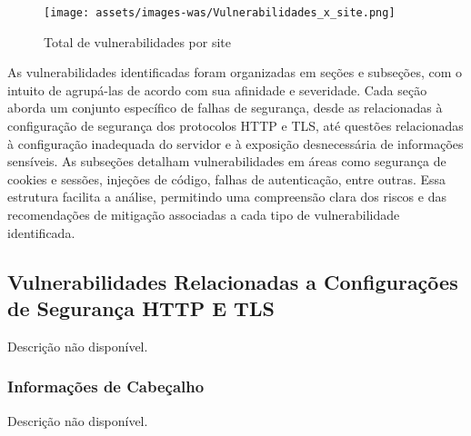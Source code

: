 \documentclass[a4paper,12pt]{article}
\begin{document}
\begin{figure}[h!]
    \centering
    \texttt{[image: assets/images-was/Vulnerabilidades\_x\_site.png]}
    \caption{Total de vulnerabilidades por site}
\end{figure}
\FloatBarrier
As vulnerabilidades identificadas foram organizadas em seções e subseções, com o intuito de agrupá-las de acordo com sua afinidade e severidade. Cada seção aborda um conjunto específico de falhas de segurança, desde as relacionadas à configuração de segurança dos protocolos HTTP e TLS, até questões relacionadas à configuração inadequada do servidor e à exposição desnecessária de informações sensíveis. As subseções detalham vulnerabilidades em áreas como segurança de cookies e sessões, injeções de código, falhas de autenticação, entre outras. Essa estrutura facilita a análise, permitindo uma compreensão clara dos riscos e das recomendações de mitigação associadas a cada tipo de vulnerabilidade identificada.

\subsection{Vulnerabilidades Relacionadas a Configurações de Segurança HTTP E TLS}
Descrição não disponível.

\subsubsection{Informações de Cabeçalho}
Descrição não disponível.
\end{document}
